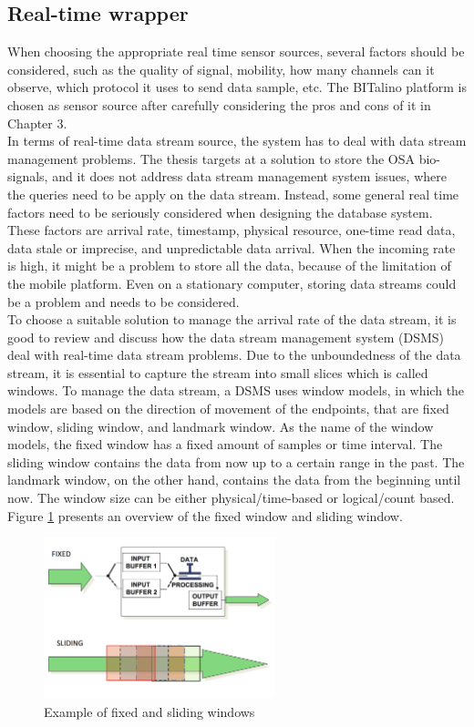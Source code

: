 \subsection{Real-time wrapper}
When choosing the appropriate real time sensor sources, several factors should be considered, such as the quality of signal, mobility, how many channels can it observe, which protocol it uses to send data sample, etc. The BITalino platform is chosen as sensor source after carefully considering the pros and cons of it in Chapter 3.\\
In terms of real-time data stream source, the system has to deal with data stream management problems. The thesis targets at a solution to store the OSA bio-signals, and it does not address data stream management system issues, where the queries need to be apply on the data stream. Instead, some general real time factors need to be seriously considered when designing the database system. These factors are arrival rate, timestamp, physical resource, one-time read data, data stale or imprecise, and unpredictable data arrival. When the incoming rate is high, it might be a problem to store all the data, because of the limitation of the mobile platform. Even on a stationary computer, storing data streams could be a problem and needs to be considered.\\
To choose a suitable solution to manage the arrival rate of the data stream, it is good to review and discuss how the data stream management system (DSMS) deal with real-time data stream problems. Due to the unboundedness of the data stream, it is essential to capture the stream into small slices which is called windows. To manage the data stream, a DSMS uses window models, in which the models are based on the direction of movement of the endpoints, that are fixed window, sliding window, and landmark window. As the name of the window models, the fixed window has a fixed amount of samples or time interval. The sliding window contains the data from now up to a certain range in the past. The landmark window, on the other hand, contains the data from the beginning until now. The window size can be either physical/time-based or logical/count based. Figure \ref{fig:Figures/windows} presents an overview of the fixed window and sliding window.
\begin{figure}
    \centering
    \includegraphics[width=0.6\textwidth]{Figures/WINDOWDSMS.png}
    \caption{Example of fixed and sliding windows \citep{DSMS_WINDOW}}
    \label{fig:Figures/windows}
\end{figure}
